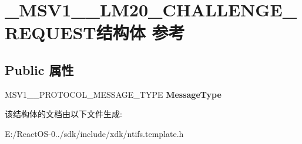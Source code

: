 \hypertarget{struct___m_s_v1__0___l_m20___c_h_a_l_l_e_n_g_e___r_e_q_u_e_s_t}{}\section{\+\_\+\+M\+S\+V1\+\_\+\_\+\+L\+M20\+\_\+\+C\+H\+A\+L\+L\+E\+N\+G\+E\+\_\+\+R\+E\+Q\+U\+E\+S\+T结构体 参考}
\label{struct___m_s_v1__0___l_m20___c_h_a_l_l_e_n_g_e___r_e_q_u_e_s_t}
\subsection*{Public 属性}
\begin{DoxyCompactItemize}
\item 
\mbox{\label{struct___m_s_v1__0___l_m20___c_h_a_l_l_e_n_g_e___r_e_q_u_e_s_t_a9efcd23aa81c21963ea41500e6705dd6}} 
M\+S\+V1\+\_\+\_\+\+P\+R\+O\+T\+O\+C\+O\+L\+\_\+\+M\+E\+S\+S\+A\+G\+E\+\_\+\+T\+Y\+PE {\bfseries Message\+Type}
\end{DoxyCompactItemize}


该结构体的文档由以下文件生成\+:\begin{DoxyCompactItemize}
\item 
E\+:/\+React\+O\+S-\/0../sdk/include/xdk/ntifs.\+template.\+h\end{DoxyCompactItemize}
